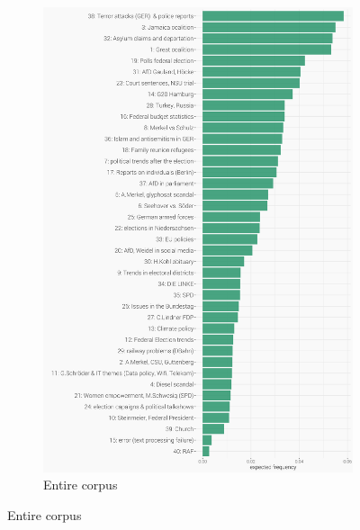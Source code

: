 \documentclass[12pt,a4paper,notitlepage]{article}
\begin{document}
\begin{figure}[H]
	\begin{center}
	\caption{Expected topic proportion}
	\begin{subfigure}[normla]{0.4\textwidth}
		\includegraphics[width=\textwidth,keepaspectratio]{../figs/topic_proportion.png}
		\caption{Entire corpus}
		\label{fig_topic_proportion}
	\end{subfigure}
	

\end{center}
\end{figure}
\end{document}
